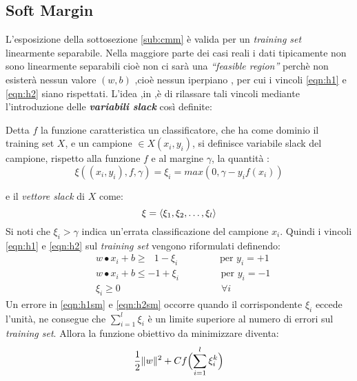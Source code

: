 \subsection{Soft Margin}
\label{sub:softmargin}
L'esposizione della sottosezione \ref{sub:cmm} è valida per un \textit{training set} linearmente separabile. Nella maggiore parte dei casi reali i dati tipicamente non sono linearmente separabili cioè non ci sarà una \textit{``feasible region''} perchè non esisterà nessun valore $(w,b)$ ,cioè nessun iperpiano , per cui i vincoli \ref{eqn:h1} e \ref{eqn:h2} siano rispettati. L'idea ,in \cite{Cortes95},è di rilassare tali vincoli  mediante l'introduzione delle \textit{\textbf{variabili slack}} così definite:
\begin{definizione*}
Detta $f$ la funzione caratteristica un classificatore, che ha come dominio il training set $X$, e un campione $\in X (x_i , y_i)$, si definisce variabile slack del campione, rispetto alla funzione $f$ e al margine $\gamma$, la quantità :
\begin{equation*}
\xi((x_i , y_i) , f , \gamma  ) = \xi_{i} = max(0 , \gamma - y_if(x_i))
\end{equation*}
\end{definizione*}
e il \textit{vettore slack} di $X$ come:
\[ 
\xi = \Braket{\xi_1,\xi_2,\dots,\xi_l}
\] 
Si noti che $\xi_i > \gamma$ indica un'errata classificazione del campione $x_i$.
Quindi i vincoli \ref{eqn:h1} e \ref{eqn:h2} sul \textit{training set} vengono riformulati definendo:
\begin{align}
&w \bullet x_i + b \geq \:\:\:1-\xi_i \qquad \qquad\text{ per } y_i = +1 \label{eqn:h1sm}\\
&w \bullet x_i + b \leq -1+\xi_i \qquad \qquad\text{ per } y_i = -1  \label{eqn:h2sm}\\
&\xi_i \geq 0 \quad \qquad \qquad \qquad \qquad \quad\:\: \forall i \label{eqn:slack}
\end{align}
Un errore in \eqref{eqn:h1sm} e \eqref{eqn:h2sm} occorre quando il corrispondente $\xi_i$ eccede l'unità, ne consegue che $\sum_{i=1}^{l}\xi_i$ è un limite superiore al numero di errori sul \textit{training set}. Allora la funzione obiettivo da minimizzare diventa:
\begin{equation}
\label{eq:softorig}
\frac{1}{2}\lVert w\rVert^2 + Cf\Bigl(\sum_{i=1}^{l}\xi_i^k\Bigl)
\end{equation}
